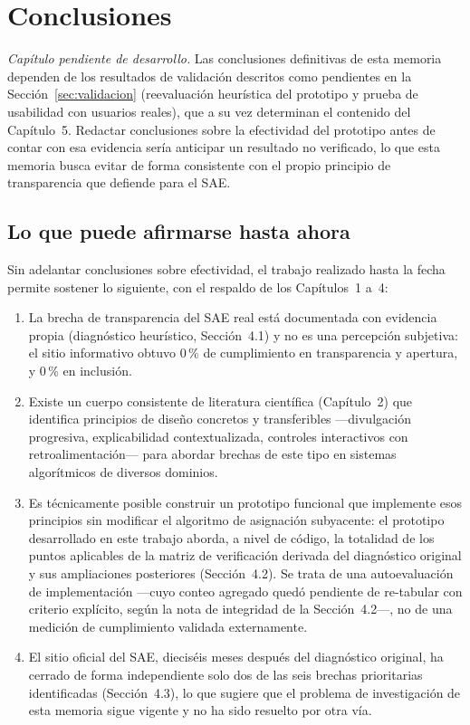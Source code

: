 \chapter{Conclusiones}

\emph{Capítulo pendiente de desarrollo.} Las conclusiones definitivas de esta memoria dependen de los resultados de validación descritos como pendientes en la Sección~\ref{sec:validacion} (reevaluación heurística del prototipo y prueba de usabilidad con usuarios reales), que a su vez determinan el contenido del Capítulo~5. Redactar conclusiones sobre la efectividad del prototipo antes de contar con esa evidencia sería anticipar un resultado no verificado, lo que esta memoria busca evitar de forma consistente con el propio principio de transparencia que defiende para el SAE.

\section*{Lo que puede afirmarse hasta ahora}

Sin adelantar conclusiones sobre efectividad, el trabajo realizado hasta la fecha permite sostener lo siguiente, con el respaldo de los Capítulos~1 a~4:

\begin{enumerate}
    \item La brecha de transparencia del SAE real está documentada con evidencia propia (diagnóstico heurístico, Sección~4.1) y no es una percepción subjetiva: el sitio informativo obtuvo 0\,\% de cumplimiento en transparencia y apertura, y 0\,\% en inclusión.
    \item Existe un cuerpo consistente de literatura científica (Capítulo~2) que identifica principios de diseño concretos y transferibles —divulgación progresiva, explicabilidad contextualizada, controles interactivos con retroalimentación— para abordar brechas de este tipo en sistemas algorítmicos de diversos dominios.
    \item Es técnicamente posible construir un prototipo funcional que implemente esos principios sin modificar el algoritmo de asignación subyacente: el prototipo desarrollado en este trabajo aborda, a nivel de código, la totalidad de los puntos aplicables de la matriz de verificación derivada del diagnóstico original y sus ampliaciones posteriores (Sección~4.2). Se trata de una autoevaluación de implementación —cuyo conteo agregado quedó pendiente de re-tabular con criterio explícito, según la nota de integridad de la Sección~4.2—, no de una medición de cumplimiento validada externamente.
    \item El sitio oficial del SAE, dieciséis meses después del diagnóstico original, ha cerrado de forma independiente solo dos de las seis brechas prioritarias identificadas (Sección~4.3), lo que sugiere que el problema de investigación de esta memoria sigue vigente y no ha sido resuelto por otra vía.
\end{enumerate}

